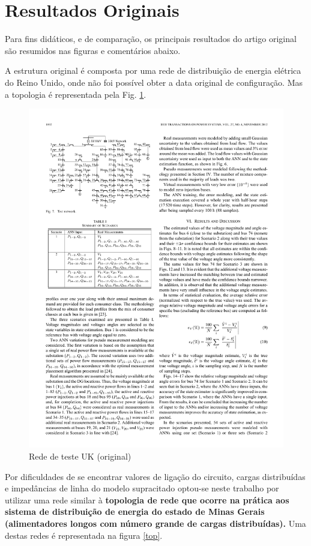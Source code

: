 \documentclass{IEEEtran}
\begin{document}
\section{Resultados Originais}
Para fins didáticos, e de comparação, os principais resultados do artigo original são resumidos nas figuras e comentários abaixo.

A estrutura original é composta por uma rede de distribuição de energia elétrica do Reino Unido, onde não foi possível obter a data original de configuração. Mas a topologia é representada pela Fig. \ref{top_uk}.

\begin{figure}
	\centering
	\includegraphics{topologia_UK.pdf}
	\caption{Rede de teste UK (original)}
	\label{top_uk}
\end{figure}

Por dificuldades de se encontrar valores de ligação do circuito, cargas distribuídas e impedâncias de linha do modelo supracitado optou-se neste trabalho por utilizar uma rede similar à \textbf{topologia de rede que ocorre na prática aos sistema de distribuição de energia do estado de Minas Gerais (alimentadores longos com número grande de cargas distribuídas).} Uma destas redes é representada na figura \ref{top}.
\end{document}
